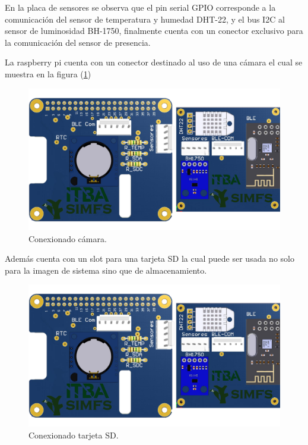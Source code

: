 En la placa de sensores se observa que el pin serial GPIO corresponde a la comunicación del sensor de temperatura y humedad DHT-22, y el bus I2C al sensor de luminosidad BH-1750, finalmente cuenta con un conector exclusivo para la comunicación del sensor de presencia.

La raspberry pi cuenta con un conector destinado al uso de una cámara el cual se muestra en la figura (\ref{fig:rpiFront})
\begin{figure}[H]
	\centering
	\includegraphics[width=\linewidth,page=3]{ImagenesIngenieria de Detalle/RPI}		
	\caption{Conexionado cámara.}
	\label{fig:rpiFront}
\end{figure}
Además cuenta con un slot para una tarjeta SD la cual puede ser usada no solo para la imagen de sistema sino que de almacenamiento.
\begin{figure}[H]
	\centering
	\includegraphics[width=0.9\linewidth,page=2]{ImagenesIngenieria de Detalle/RPI}		
	\caption{Conexionado tarjeta SD.}
	\label{fig:rpiBack}
\end{figure}


